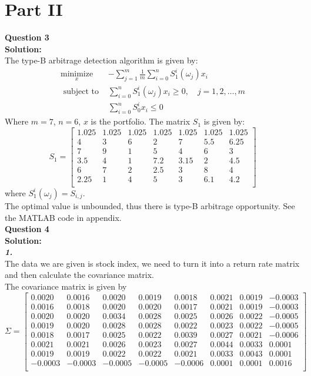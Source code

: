 \documentclass[11pt,a4paper]{article}
\begin{document}
\section{Part II}
\textbf{Question 3}\\
\textbf{Solution:}\\
The type-B arbitrage detection algorithm is given by:
$$\begin{array}{ll}
\underset{x}{\operatorname{minimize}} 
& -\sum_{j=1}^{m} \frac{1}{m} \sum_{i=0}^{n} S_{1}^{i}\left(\omega_{j}\right) x_{i} \\ \text { subject to }
& \sum_{i=0}^{n} S_{1}^{i}\left(\omega_{j}\right) x_{i} \geq 0, \quad j=1,2, \ldots, m \\ 
& \sum_{i=0}^{n} S_{0}^{i} x_{i} \leq 0
\end{array}$$
Where $m=7$, $n=6$, $x$ is the portfolio. The matrix $S_{1}$ is given by:
$$S_{1}=
\begin{bmatrix}
1.025 & 1.025& 1.025& 1.025& 1.025& 1.025& 1.025\\
4& 3& 6& 2& 7& 5.5& 6.25\\
7 &9& 1 &5 &4& 6& 3\\
3.5& 4& 1& 7.2& 3.15& 2& 4.5\\
6& 7& 2& 2.5& 3 &8& 4\\
2.25& 1& 4& 5& 3& 6.1& 4.2\\
\end{bmatrix}$$
where $S_{1}^{i}(\omega_{j})=S_{i,j}$.\\
The optimal value is unbounded, thus there is type-B arbitrage opportunity. See the MATLAB code in appendix.\\



\textbf{Question 4}\\
\textbf{Solution:}\\
\textit{\textbf{1.}}\\
The data we are given is stock index, we need to turn it into a return rate matrix and then calculate the covariance matrix.\\
The covariance matrix is given by
$$\Sigma=
\begin{bmatrix}
0.0020  &  0.0016  &  0.0020  &  0.0019  &  0.0018  &  0.0021  &  0.0019  & -0.0003\\ 
0.0016  &  0.0018  &  0.0020  &  0.0020  &  0.0017  &  0.0021  &  0.0019  & -0.0003 \\
0.0020  &  0.0020  &  0.0034  &  0.0028  &  0.0025  &  0.0026  &  0.0022  & -0.0005 \\
0.0019  &  0.0020  &  0.0028  &  0.0028  &  0.0022  &  0.0023  &  0.0022  & -0.0005 \\
0.0018  &  0.0017  &  0.0025  &  0.0022  &  0.0039  &  0.0027  &  0.0021  & -0.0006 \\
0.0021  &  0.0021  &  0.0026  &  0.0023  &  0.0027  &  0.0044  &  0.0033  &  0.0001 \\
0.0019  &  0.0019  &  0.0022  &  0.0022  &  0.0021  &  0.0033  &  0.0043  &  0.0001 \\
-0.0003 &  -0.0003 &  -0.0005 &  -0.0005 &  -0.0006 &   0.0001 &   0.0001 &   0.0016\\
\end{bmatrix}$$
\end{document}
